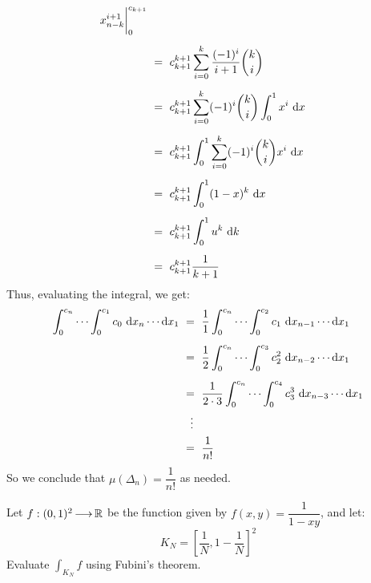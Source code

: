 \begin{soln}
\begin{align*}
        x_{n-k}^{i+1}\bigg\rvert_{0}^{c_{k+1}} \vsp
        & \ = \ c_{k+1}^{k+1}\sum_{i=0}^{k}\frac{(-1)^{i}}{i+1}\binom k i \vsp
        & \ = \ c_{k+1}^{k+1}\sum_{i=0}^{k}(-1)^{i}\binom k i \int_{0}^{1}x^{i}\
        \d x \vsp
        & \ = \ c_{k+1}^{k+1}\int_{0}^{1}\sum_{i=0}^{k}(-1)^{i}\binom k ix^{i}\
        \d x \vsp
        & \ = \ c_{k+1}^{k+1}\int_{0}^{1}(1-x)^{k}\ \d x \vsp
        & \ = \ c_{k+1}^{k+1}\int_{0}^{1}u^{k}\ \d k \vsp
        & \ = \ c_{k+1}^{k+1}\frac{1}{k+1}
    \end{align*}
    Thus, evaluating the integral, we get:
    \begin{align*}
        \int_{0}^{c_{n}}\cdots \int_{0}^{c_{1}}
        c_{0}\ \d x_{n}\cdots \d x_{1} & \ = \ \frac{1}{1}
        \int_{0}^{c_{n}}\cdots \int_{0}^{c_{2}}
        c_{1}\ \d x_{n-1}\cdots \d x_{1} \vsp
        & \ = \ \frac{1}{2} \int_{0}^{c_{n}}\cdots \int_{0}^{c_{3}}
        c_{2}^{2}\ \d x_{n-2}\cdots \d x_{1} \vsp
        & \ = \ \frac{1}{2\cdot3} \int_{0}^{c_{n}}\cdots \int_{0}^{c_{4}}
        c_{3}^{3}\ \d x_{n-3}\cdots \d x_{1} \\
        & \ \ \ \vdots \\
        & \ = \ \frac{1}{n!}
    \end{align*}
    So we conclude that $ \mu(\Delta_{n}) = \dfrac{1}{n!} $ as needed.
\end{soln}


\newpage
\label{q38}
\begin{qu}[num=38.1]
    Let $ f: (0,1)^{2} \operatorname{\longrightarrow} \mathbb{R} $ be the function given by $ f(x,y) =
    \dfrac{1}{1-xy} $, and let:
    \begin{equation*}
        K_{N} = \left[ \frac{1}{N}, 1-\frac{1}{N} \right]^{2}
    \end{equation*}
    Evaluate $ \displaystyle\int_{K_{N}}f $ using Fubini's theorem.
\end{qu}

